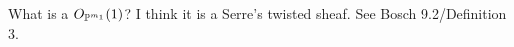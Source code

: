 

\begin{comment}%
\bfsubsection{Adjacent to 2.4}
\barquo{
In other words, the absolute (logarithmic) Weil height is not invariant under linear coordinate changes. This is why it is sometimes called the naive height.
}
\begin{que}
  Why they want the height to be invariant? Is there a non-constant invariant height?
\end{que}
\end{comment}

\begin{rem}
What is a $O_{\P^{m_1} }(1)$? I think it is a Serre's twisted sheaf. See Bosch\cite{Bosch} 9.2/Definition 3. 
\end{rem}
